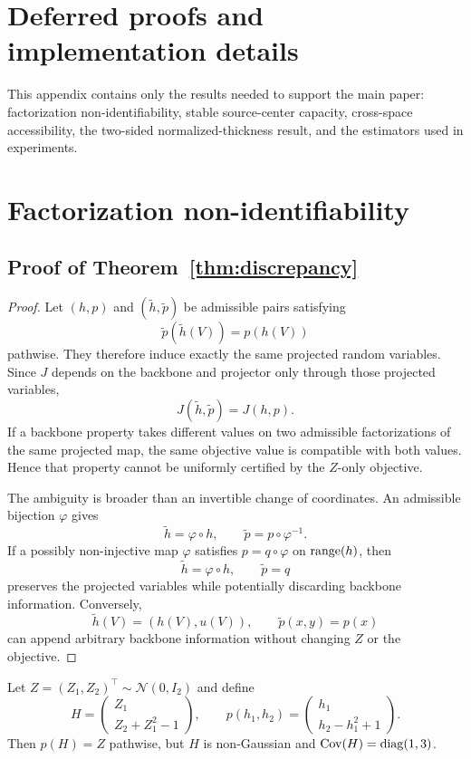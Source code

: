 \section{Deferred proofs and implementation details}\label{app:proofs}

This appendix contains only the results needed to support the main paper:
factorization non-identifiability, stable source-center capacity, cross-space
accessibility, the two-sided normalized-thickness result, and the estimators used
in experiments.

\section{Factorization non-identifiability}\label{app:discrepancy}

\subsection{Proof of Theorem~\ref{thm:discrepancy}}

\begin{proof}
Let $(h,p)$ and $(\widetilde h,\widetilde p)$ be admissible pairs satisfying
\[
\widetilde p(\widetilde h(V))=p(h(V))
\]
pathwise. They therefore induce exactly the same projected random variables.
Since $J$ depends on the backbone and projector only through those projected
variables,
\[
J(\widetilde h,\widetilde p)=J(h,p).
\]
If a backbone property takes different values on two admissible factorizations
of the same projected map, the same objective value is compatible with both
values. Hence that property cannot be uniformly certified by the $Z$-only
objective.

The ambiguity is broader than an invertible change of coordinates. An
admissible bijection $\varphi$ gives
\[
\widetilde h=\varphi\circ h,
\qquad
\widetilde p=p\circ\varphi^{-1}.
\]
If a possibly non-injective map $\varphi$ satisfies $p=q\circ\varphi$ on
$\operatorname{range}(h)$, then
\[
\widetilde h=\varphi\circ h,
\qquad
\widetilde p=q
\]
preserves the projected variables while potentially discarding backbone
information. Conversely,
\[
\widetilde h(V)=(h(V),u(V)),
\qquad
\widetilde p(x,y)=p(x)
\]
can append arbitrary backbone information without changing $Z$ or the
objective.
\end{proof}

\begin{corollary}
\label{cor:gaussian}
Let $Z=(Z_1,Z_2)^\top\sim\mathcal N(0,I_2)$ and define
\[
H=
\begin{pmatrix}
Z_1\\
Z_2+Z_1^2-1
\end{pmatrix},
\qquad
p(h_1,h_2)=
\begin{pmatrix}
h_1\\
h_2-h_1^2+1
\end{pmatrix}.
\]
Then $p(H)=Z$ pathwise, but $H$ is non-Gaussian and
$\operatorname{Cov}(H)=\operatorname{diag}(1,3)$.
\end{corollary}

